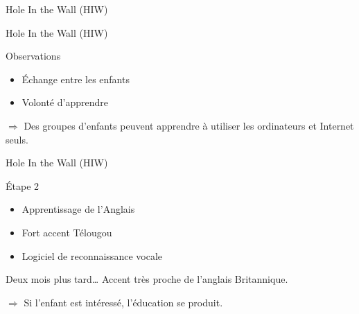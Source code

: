 \begin{frame}{Hole In the Wall (HIW)}
\begin{center}
\end{center}
\end{frame}

\begin{frame}{Hole In the Wall (HIW)}
  \begin{block}{Observations}
    \begin{itemize}
      \item Échange entre les enfants
      \item Volonté d'apprendre
    \end{itemize}
    $\Rightarrow$ Des groupes d'enfants peuvent apprendre à utiliser les ordinateurs et Internet seuls.
  \end{block}
\end{frame}

\begin{frame}{Hole In the Wall (HIW)}
  \begin{block}{Étape 2}
    \begin{itemize}
      \item Apprentissage de l'Anglais
      \item Fort accent Télougou
      \item Logiciel de reconnaissance vocale
    \end{itemize}
  \end{block}
\pause
  \begin{block}{Deux mois plus tard\ldots}
    Accent très proche de l'anglais Britannique.
    
    $\Rightarrow$ Si l'enfant est intéressé, l'éducation se produit.
  \end{block}
\end{frame}

